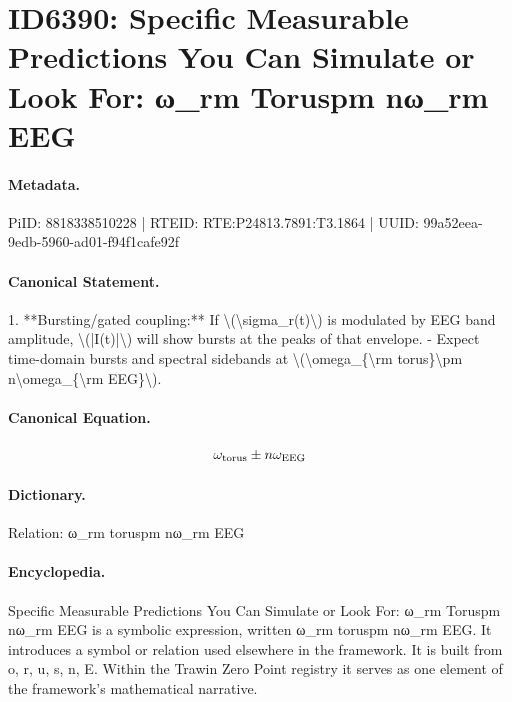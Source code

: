 \section*{ID6390: Specific Measurable Predictions You Can Simulate or Look For: ω\_rm Toruspm nω\_rm EEG}
\paragraph{Metadata.}
PiID: 8818338510228 | RTEID: RTE:P24813.7891:T3.1864 | UUID: 99a52eea-9edb-5960-ad01-f94f1cafe92f

\paragraph{Canonical Statement.}
1. **Bursting/gated coupling:** If \textbackslash{}(\textbackslash{}sigma\_r(t)\textbackslash{}) is modulated by EEG band amplitude, \textbackslash{}(|I(t)|\textbackslash{}) will show bursts at the peaks of that envelope. - Expect time-domain bursts and spectral sidebands at \textbackslash{}(\textbackslash{}omega\_\{\textbackslash{}rm torus\}\textbackslash{}pm n\textbackslash{}omega\_\{\textbackslash{}rm EEG\}\textbackslash{}).

\paragraph{Canonical Equation.}
\[
\omega_{\rm torus}\pm n\omega_{\rm EEG}
\]

\paragraph{Dictionary.}
Relation: ω\_rm toruspm nω\_rm EEG

\paragraph{Encyclopedia.}
Specific Measurable Predictions You Can Simulate or Look For: ω\_rm Toruspm nω\_rm EEG is a symbolic expression, written ω\_rm toruspm nω\_rm EEG. It introduces a symbol or relation used elsewhere in the framework. It is built from o, r, u, s, n, E. Within the Trawin Zero Point registry it serves as one element of the framework's mathematical narrative.
